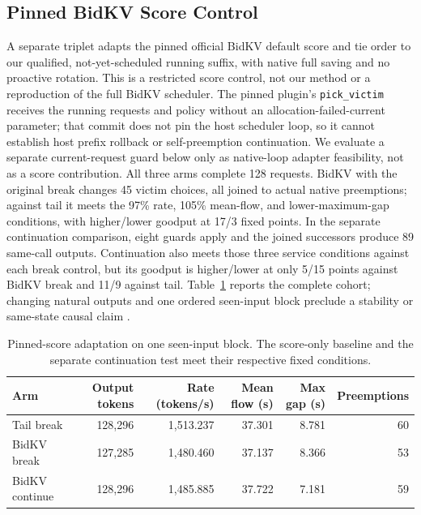 \documentclass[10pt]{article}
\begin{document}
\subsection{Pinned BidKV Score Control}
A separate triplet adapts the pinned official BidKV default score and tie order to our qualified, not-yet-scheduled running suffix, with native full saving and no proactive rotation. This is a restricted score control, not our method or a reproduction of the full BidKV scheduler. The pinned plugin's \texttt{pick\_victim} receives the running requests and policy without an allocation-failed-current parameter; that commit does not pin the host scheduler loop, so it cannot establish host prefix rollback or self-preemption continuation. We evaluate a separate current-request guard below only as native-loop adapter feasibility, not as a score contribution. All three arms complete 128 requests. BidKV with the original break changes 45 victim choices, all joined to actual native preemptions; against tail it meets the 97\% rate, 105\% mean-flow, and lower-maximum-gap conditions, with higher/lower goodput at 17/3 fixed points. In the separate continuation comparison, eight guards apply and the joined successors produce 89 same-call outputs. Continuation also meets those three service conditions against each break control, but its goodput is higher/lower at only 5/15 points against BidKV break and 11/9 against tail. Table~\ref{tab:bidkvscore} reports the complete cohort; changing natural outputs and one ordered seen-input block preclude a stability or same-state causal claim \cite{bidkvcode,bidkvresult}.

\begin{table}[t]
\centering\small
\caption{Pinned-score adaptation on one seen-input block. The score-only baseline and the separate continuation test meet their respective fixed conditions.}
\label{tab:bidkvscore}
\begin{tabular}{lrrrrr}
\toprule
Arm & Output tokens & Rate (tokens/s) & Mean flow (s) & Max gap (s) & Preemptions \\
\midrule
Tail break & 128,296 & 1,513.237 & 37.301 & 8.781 & 60 \\
BidKV break & 127,285 & 1,480.460 & 37.137 & 8.366 & 53 \\
BidKV continue & 128,296 & 1,485.885 & 37.722 & 7.181 & 59 \\
\bottomrule
\end{tabular}
\end{table}
\end{document}
